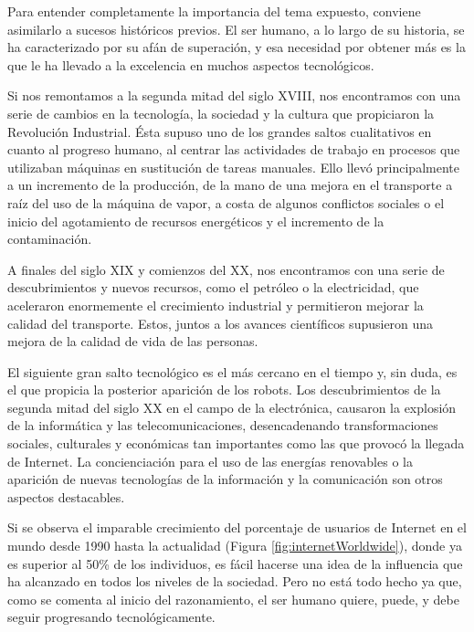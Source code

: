 \documentclass[12pt,spanish,chapterprefix, numbers=noenddot]{book}
\numberwithin{equation}{section}
\numberwithin{figure}{section}
\begin{document}
Para entender completamente la importancia del tema expuesto, conviene asimilarlo a sucesos históricos previos. El ser humano, a lo largo de su historia, se ha caracterizado por su afán de superación, y esa necesidad por obtener más es la que le ha llevado a la excelencia en muchos aspectos tecnológicos. 

Si nos remontamos a la segunda mitad del siglo XVIII,  nos encontramos con una serie de cambios en la tecnología, la sociedad y la cultura que propiciaron la Revolución Industrial. Ésta supuso uno de los grandes saltos cualitativos en cuanto al progreso humano, al centrar las actividades de trabajo en procesos que utilizaban máquinas en sustitución de tareas manuales. Ello llevó principalmente a un incremento de la producción, de la mano de una mejora en el transporte a raíz del uso de la máquina de vapor, a costa de algunos conflictos sociales o el inicio del agotamiento de recursos energéticos y el incremento de la contaminación. 

A finales del siglo XIX y comienzos del XX, nos encontramos con una serie de descubrimientos y nuevos recursos, como el petróleo o la electricidad, que aceleraron enormemente el crecimiento industrial y permitieron mejorar la calidad del transporte. Estos, juntos a los avances científicos supusieron una mejora de la calidad de vida de las personas.

El siguiente gran salto tecnológico es el más cercano en el tiempo y, sin duda, es el que propicia la posterior aparición de los robots. Los descubrimientos de la segunda mitad del siglo XX en el campo de la electrónica, causaron la explosión de la informática y las telecomunicaciones, desencadenando transformaciones sociales, culturales y económicas tan importantes como las que provocó la llegada de Internet. La concienciación para el uso de las energías renovables o la aparición de nuevas tecnologías de la información y la comunicación son otros aspectos destacables. 

Si se observa el imparable crecimiento del porcentaje de usuarios de Internet en el mundo desde 1990 hasta la actualidad (Figura \ref{fig:internetWorldwide}), donde ya es superior al 50\% de los individuos, es fácil hacerse una idea de la influencia que ha alcanzado en todos los niveles de la sociedad. Pero no está todo hecho ya que, como se comenta al inicio del razonamiento, el ser humano quiere, puede, y debe seguir progresando tecnológicamente.  %
\end{document}
